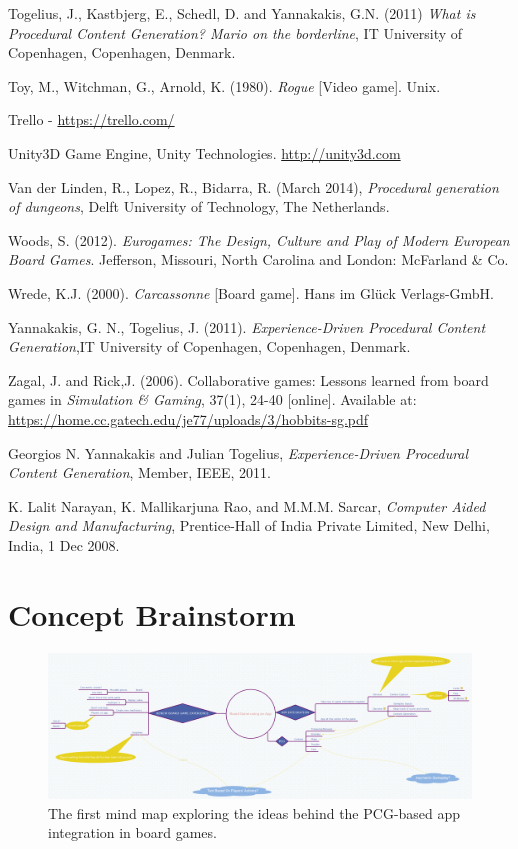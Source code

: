 \documentclass[a4paper,11pt]{report}
\begin{document}
\begin{thebibliography}{1}
Togelius, J., Kastbjerg, E., Schedl, D. and Yannakakis, G.N. (2011) \emph{What is Procedural Content Generation? Mario on the borderline}, IT University of Copenhagen, Copenhagen, Denmark.

Toy, M., Witchman, G., Arnold, K. (1980). \textit{Rogue} [Video game]. Unix.

Trello - \url{https://trello.com/}


Unity3D Game Engine, Unity Technologies.
\url{http://unity3d.com}

Van der Linden, R., Lopez, R., Bidarra, R. (March 2014), \textit{Procedural generation of dungeons}, Delft University of Technology, The Netherlands.

Woods, S. (2012). \textit{Eurogames: The Design, Culture and Play of Modern European Board Games}. Jefferson, Missouri, North Carolina and London: McFarland \& Co.

Wrede, K.J. (2000). \textit{Carcassonne} [Board game]. Hans im Glück Verlags-GmbH.

Yannakakis, G. N., Togelius, J. (2011). \textit{Experience-Driven Procedural Content Generation},IT University of Copenhagen, Copenhagen, Denmark.

Zagal, J. and Rick,J. (2006). Collaborative games: Lessons learned from board games in \textit{Simulation \& Gaming}, 37(1), 24-40 [online]. Available at: \url{https://home.cc.gatech.edu/je77/uploads/3/hobbits-sg.pdf}

Georgios N. Yannakakis and Julian Togelius, \emph{Experience-Driven Procedural Content Generation}, Member, IEEE, 2011.

K. Lalit Narayan, K. Mallikarjuna Rao, and M.M.M. Sarcar, \emph{Computer Aided Design and Manufacturing}, Prentice-Hall of India Private Limited, New Delhi, India, 1 Dec 2008.

\end{thebibliography}
\pagebreak
\appendix
\chapter{Concept Brainstorm}
\begin{figure}[h]
    \centering
    \includegraphics[scale=0.18,angle=-90]{Images/Brainstorm1.png}
    \caption{The first mind map exploring the ideas behind the PCG-based app integration in board games.}
    \label{fig:brainstorm1}
\end{figure}
\end{document}
